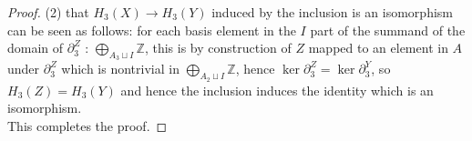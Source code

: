 \begin{proof}
    (2) that $H_3(X) \to H_3(Y)$ induced by the inclusion
    is an isomorphism can be seen as follows:
    for each basis element in the $I$ part of
    the summand of the domain of $\partial_3^{Z}$ :
    $\bigoplus_{A_3 \sqcup I} \mathbb{Z}$, this
    is by construction of $Z$ mapped
    to an element in $A$ under $\partial_3^{Z}$ which
    is nontrivial in
    $\bigoplus_{A_2 \sqcup I}\mathbb{Z}$, hence
    $\ker \partial_3^{Z} = \ker \partial_3^{Y}$, so
    $H_3 (Z) = H_3(Y)$ and hence
    the inclusion induces the identity which is
    an isomorphism.\\
    \linebreak
    This completes the proof.
    \end{proof}


